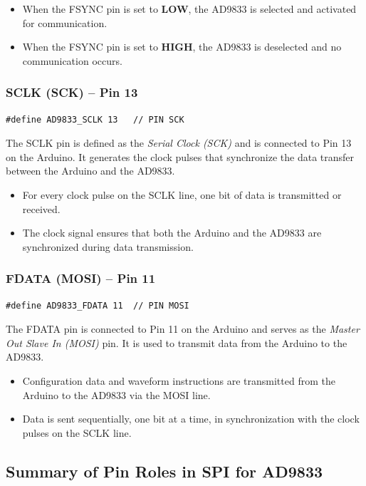 \begin{itemize}
    \item When the FSYNC pin is set to \textbf{LOW}, the AD9833 is selected and activated for communication.
    \item When the FSYNC pin is set to \textbf{HIGH}, the AD9833 is deselected and no communication occurs.
\end{itemize}

\subsubsection{SCLK (SCK) – Pin 13}
\begin{verbatim}
#define AD9833_SCLK 13   // PIN SCK
\end{verbatim}

The SCLK pin is defined as the \textit{Serial Clock (SCK)} and is connected to Pin 13 on the Arduino. It generates the clock pulses that synchronize the data transfer between the Arduino and the AD9833.

\begin{itemize}
    \item For every clock pulse on the SCLK line, one bit of data is transmitted or received.
    \item The clock signal ensures that both the Arduino and the AD9833 are synchronized during data transmission.
\end{itemize}

\subsubsection{FDATA (MOSI) – Pin 11}
\begin{verbatim}
#define AD9833_FDATA 11  // PIN MOSI
\end{verbatim}

The FDATA pin is connected to Pin 11 on the Arduino and serves as the \textit{Master Out Slave In (MOSI)} pin. It is used to transmit data from the Arduino to the AD9833.

\begin{itemize}
    \item Configuration data and waveform instructions are transmitted from the Arduino to the AD9833 via the MOSI line.
    \item Data is sent sequentially, one bit at a time, in synchronization with the clock pulses on the SCLK line.
\end{itemize}

\subsection{Summary of Pin Roles in SPI for AD9833}

